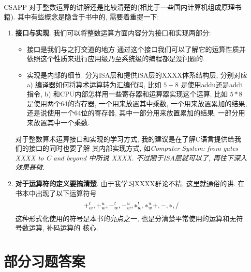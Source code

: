 \documentclass[ a4paper, 10pt ]{article}
\begin{document}
CSAPP 对于整数运算的讲解还是比较清楚的(相比于一些国内计算机组成原理书籍).
其中有些概念是隐含于书中的, 需要着重提一下:

\begin{enumerate}

\item \textbf{接口与实现}.
我们可以将整数运算方面内容分为接口和实现两部分:
\begin{itemize}

\item 接口是我们与之打交道的地方
通过这个接口我们可以了解它的运算性质并依照这个性质来进行应用级乃至系统级的编程都是没问题的.

\item 实现是内部的细节. 分为ISA层和提供ISA层的XXXX体系结构层, 
分别对应 a) 编译器如何将算术运算转为汇编代码, 比如 $5+8$ 是使用addu还是addi指令,
b) 和CPU内部怎样用一些寄存器和运算器实现这个运算, 比如 $5*8$是使用两个64的寄存器, 
一个用来放置其中乘数, 一个用来放置累加的结果, 还是说使用一个64位的寄存器, 
其中一部分用来放置累加的结果, 一部分用来放置其中一个乘数.
\end{itemize}

对于整数算术运算接口和实现的学习方式, 我的建议是在了解C语言提供给我们的接口的同时也要了解
其内部实现方式, 如\it{Computer System: from gates XXXX to C and beyond} 中所说 XXXX.
不过限于ISA层就可以了, 再往下深入效果甚微.

\item \textbf{对于运算符的定义要搞清楚}.
由于我学习XXXX群论不精, 这里就通俗的讲.
在书本中出现了以下运算符号
\begin{displaymath}
	+^{t}_{w}, +^{u}_{w}, -^{t}_{w}, -^{u}_{w}, *^{t}_{w}, *^{u}_{w}\\
	+, -, *, /
\end{displaymath}
这种形式化使用的符号是本书的亮点之一, 也是分清楚平常使用的运算和无符号数运算, 补码运算的
核心.

\end{enumerate}


\section{部分习题答案}
\end{document}

